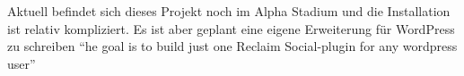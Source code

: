 \medskip

Aktuell befindet sich dieses Projekt noch im Alpha Stadium und die Installation ist relativ kompliziert. Es ist aber geplant eine eigene Erweiterung für WordPress zu schreiben \enquote{he goal is to build just one Reclaim Social-plugin for any wordpress user}\cite[How Does It Work]{Schwenzel2013}


